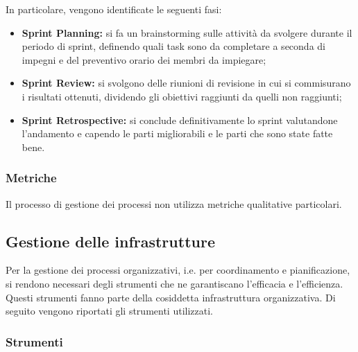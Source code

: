 In particolare, vengono identificate le seguenti fasi:
\begin{itemize}
    \item \textbf{Sprint Planning:} si fa un brainstorming sulle attività da svolgere durante il periodo di sprint, definendo quali task sono da completare a seconda di impegni e del preventivo orario dei membri da impiegare;
    \item \textbf{Sprint Review:} si svolgono delle riunioni di revisione in cui si commisurano i risultati ottenuti, dividendo gli obiettivi raggiunti da quelli non raggiunti;
    \item \textbf{Sprint Retrospective:} si conclude definitivamente lo sprint valutandone l'andamento e capendo le parti migliorabili e le parti che sono state fatte bene.
\end{itemize}

\subsubsection{Metriche}\label{sec:processi_organizzativi:gestione_processi:metriche}
Il processo di gestione dei processi non utilizza metriche qualitative particolari.


\subsection{Gestione delle infrastrutture}\label{sec:processi_organizzativi:gestione_infrastrutture}
Per la gestione dei processi organizzativi, i.e. per coordinamento e pianificazione, si rendono necessari degli strumenti che ne garantiscano l'efficacia e l'efficienza. Questi strumenti fanno parte della cosiddetta infrastruttura organizzativa.
Di seguito vengono riportati gli strumenti utilizzati.

\subsubsection{Strumenti}

